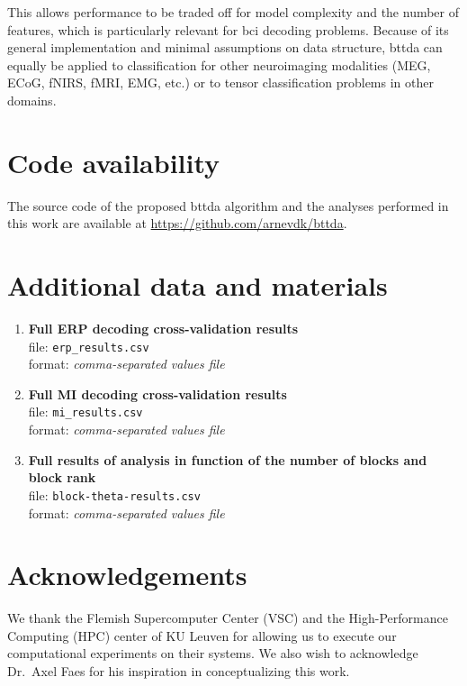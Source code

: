 \documentclass[twocolumn]{article}
\begin{document}
This allows performance to be traded off for model complexity and the number of
features, which is particularly relevant for \ac{bci} decoding problems.
Because of its general implementation and minimal assumptions on data structure,
\ac{bttda} can equally be applied to classification for other neuroimaging modalities
(MEG, ECoG, fNIRS, fMRI, EMG, etc.) or to tensor classification problems in other
domains.

\section*{Code availability}

The source code of the proposed \ac{bttda} algorithm and the analyses performed in
this work are available at \url{https://github.com/arnevdk/bttda}.

\section*{Additional data and materials}
\begin{enumerate}
	\item\textbf{Full ERP decoding cross-validation results} \\
	file: \texttt{erp\_results.csv}\\
	format: \textit{comma-separated values file}
	\label{item:add/erp-results}
	\item\textbf{Full MI decoding cross-validation results} \\
	file: \texttt{mi\_results.csv}\\
	format: \textit{comma-separated values file}
	\label{item:add/mi-results}
	\item\textbf{Full results of analysis in function of the number of blocks and block rank}\\
	file: \texttt{block-theta-results.csv}\\
	format: \textit{comma-separated values file}
	\label{item:add/blocks}
\end{enumerate}

\section*{Acknowledgements}
We thank the Flemish Supercomputer Center (VSC) and the High-Performance
Computing (HPC) center of KU Leuven for allowing us to execute our
computational experiments on their systems.
We also wish to acknowledge Dr.\ Axel Faes for his inspiration in
conceptualizing this work.
\end{document}

